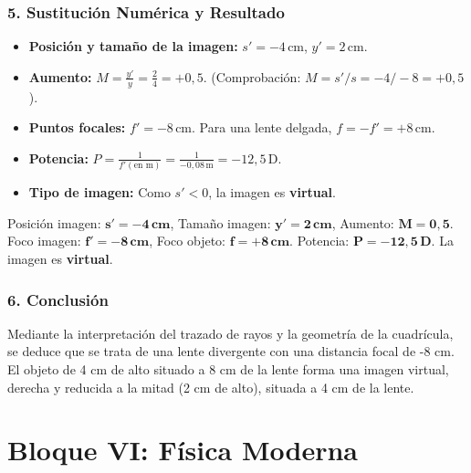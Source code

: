\subsubsection*{5. Sustitución Numérica y Resultado}
\begin{itemize}
    \item \textbf{Posición y tamaño de la imagen:} $s'=-4\,\text{cm}$, $y'=2\,\text{cm}$.
    \item \textbf{Aumento:} $M = \frac{y'}{y} = \frac{2}{4} = +0,5$. (Comprobación: $M = s'/s = -4/-8 = +0,5$).
    \item \textbf{Puntos focales:} $f'=-8\,\text{cm}$. Para una lente delgada, $f = -f' = +8\,\text{cm}$.
    \item \textbf{Potencia:} $P = \frac{1}{f' (\text{en m})} = \frac{1}{-0,08\,\text{m}} = -12,5\,\text{D}$.
    \item \textbf{Tipo de imagen:} Como $s'<0$, la imagen es \textbf{virtual}.
\end{itemize}
\begin{cajaresultado}
    Posición imagen: $\boldsymbol{s'=-4\,\textbf{cm}}$, Tamaño imagen: $\boldsymbol{y'=2\,\textbf{cm}}$, Aumento: $\boldsymbol{M=0,5}$.
    Foco imagen: $\boldsymbol{f'=-8\,\textbf{cm}}$, Foco objeto: $\boldsymbol{f=+8\,\textbf{cm}}$. Potencia: $\boldsymbol{P=-12,5\,\textbf{D}}$.
    La imagen es \textbf{virtual}.
\end{cajaresultado}

\subsubsection*{6. Conclusión}
\begin{cajaconclusion}
Mediante la interpretación del trazado de rayos y la geometría de la cuadrícula, se deduce que se trata de una lente divergente con una distancia focal de -8 cm. El objeto de 4 cm de alto situado a 8 cm de la lente forma una imagen virtual, derecha y reducida a la mitad (2 cm de alto), situada a 4 cm de la lente.
\end{cajaconclusion}

\newpage

\section{Bloque VI: Física Moderna}
\label{sec:mod_2019_jul_ext}

